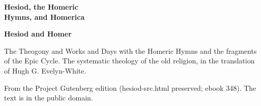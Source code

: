 \documentclass[11pt,letterpaper]{article}
\begin{document}
\color{ink}

\begin{titlepage}
\centering
\vspace*{4em}
{\LARGE\bfseries\color{heading} Hesiod, the Homeric\\[0.3em]Hymns, and Homerica\par}
\vspace{2em}
{\Large\bfseries\color{heading} Hesiod and Homer\par}
\vspace{2.5em}
{\itshape\color{subhead}\parbox{0.8\linewidth}{\centering The Theogony and Works and Days with the Homeric Hymns and the fragments of the Epic Cycle. The systematic theology of the old religion, in the translation of Hugh G. Evelyn-White.\par}}
\vfill
{\small From the Project Gutenberg edition (hesiod-src.html preserved; ebook 348). The text is in the public domain.\par}
\vspace{2em}
\end{titlepage}

\tableofcontents


\end{document}
